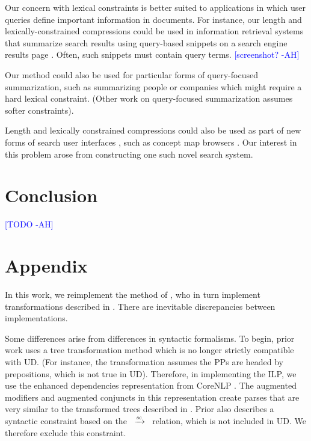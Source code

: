 \documentclass[11pt,a4paper]{article}
\newcommand{\rdep}[1]{\ $\xrightarrow{\text{\tiny #1}}$\ }
\newcommand{\ahcomment}[1]{\textcolor{blue}{[#1 -AH]}}
\begin{document}
Our concern with lexical constraints is better suited to applications in which user queries define important information in documents. For instance, our length and lexically-constrained compressions could be used in information retrieval systems that summarize search results using query-based snippets on a search engine results page \cite{tombros1998advantages,Metzler2008MachineLS}. Often, such snippets must contain query terms. \ahcomment{screenshot?}

Our method could also be used for particular forms of query-focused summarization, such as summarizing people \cite{w04} or companies \cite{filippova2009company} which might require a hard lexical constraint. (Other work on query-focused summarization \cite{das} assumes softer constraints). 

Length and lexically constrained compressions could also be used as part of new forms of search user interfaces \cite{hearst2009search}, such as concept map browsers \cite{falke2017graphdocexplore}. Our interest in this problem arose from constructing one such novel search system.

\section{Conclusion}
\ahcomment{TODO}

\section{Appendix}

In this work, we reimplement the method of \citet{filippova2013overcoming}, who in turn implement transformations described in \citet{filippova2008dependency}. There are inevitable discrepancies between implementations. 

Some differences arise from differences in syntactic formalisms. To begin, prior work uses a tree transformation method which is no longer strictly compatible with UD. (For instance, the transformation assumes the PPs are headed by prepositions, which is not true in UD). Therefore, in implementing the ILP, we use the enhanced dependencies representation from CoreNLP \cite{Schuster2016EnhancedEU}. The augmented modifiers and augmented conjuncts in this representation create parses that are very similar to the transformed trees described in \citet{filippova2008dependency}. Prior also describes a syntactic constraint based on the \rdep{sc} relation, which is not included in UD. We therefore exclude this constraint.
\end{document}
